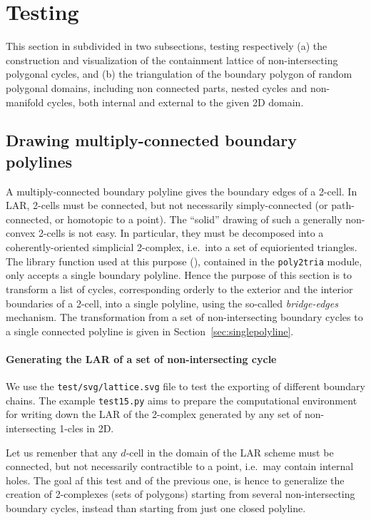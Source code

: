 \documentclass[11pt,oneside]{article}    %
\begin{document}
\section{Testing }

This section in subdivided in two subsections, testing respectively (a) the construction and visualization of the containment lattice of non-intersecting polygonal cycles, and (b) the triangulation of the boundary polygon of random polygonal domains, including non connected parts, nested cycles and non-manifold cycles, both internal and external to the given 2D domain.

\subsection{Drawing multiply-connected boundary polylines}

A multiply-connected boundary polyline gives the boundary edges of a 2-cell.
In LAR, 2-cells must be connected, but not necessarily simply-connected (or path-connected, or homotopic to a point). The ``solid'' drawing of such a generally non-convex 2-cells is not easy.
In particular, they must be decomposed into a coherently-oriented simplicial 2-complex, i.e.~into a set of equioriented triangles. The library function used at this purpose (), contained in the \texttt{poly2tria} module, only accepts a single boundary polyline. Hence the purpose of this section is to transform a list of cycles, corresponding orderly to the exterior and the interior boundaries of a 2-cell, into a single polyline, using the so-called \emph{bridge-edges}~\cite{Yamaguchi:85} mechanism. The transformation from a set of non-intersecting boundary cycles to a single connected polyline is given in Section~\ref{sec:singlepolyline}.


\paragraph{Generating the LAR of a set of non-intersecting cycle}

We use the \texttt{test/svg/lattice.svg} file to test the exporting of different boundary chains. The example \texttt{test15.py} aims to prepare the computational environment for writing down the LAR of the 2-complex generated by any set of non-intersecting 1-cles in 2D.

Let us remenber that any $d$-cell in the domain of the LAR scheme must be connected, but not necessarily contractible to a point, i.e.~may contain internal holes.
The goal af this test and of the previous one, is hence to generalize the creation of 2-complexes (sets of polygons) starting from several non-intersecting boundary cycles, instead than starting from just one closed polyline.
\end{document}
